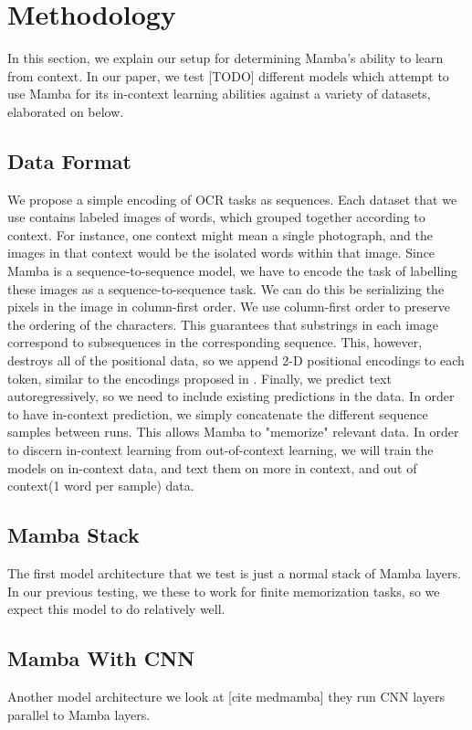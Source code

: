 \section{Methodology}
In this section, we explain our setup for determining Mamba's ability to learn
from context.
In our paper, we test [TODO] different models which attempt to use Mamba for its
in-context learning abilities against a variety of datasets, elaborated on
below.
\subsection{Data Format}
We propose a simple encoding of OCR tasks as sequences.
Each dataset that we use contains labeled images of words, which grouped
together according to context. For instance, one context might mean a single
photograph, and the images in that context would be the isolated words within
that image.
Since Mamba is a sequence-to-sequence model, we have to encode the task of
labelling these images as a sequence-to-sequence task.
We can do this be serializing the pixels in the image in column-first order. We
use column-first order to preserve the ordering of the characters. This
guarantees that substrings in each image correspond to subsequences in the
corresponding sequence.
This, however, destroys all of the positional data, so we append 2-D positional
encodings to each token, similar to the encodings proposed in \cite{attention}.
Finally, we predict text autoregressively, so we need to include existing
predictions in the data.
In order to have in-context prediction, we simply concatenate the different
sequence samples between runs. This allows Mamba to "memorize" relevant data.
In order to discern in-context learning from out-of-context learning, we will
train the models on in-context data, and text them on more in context, and out
of context(1 word per sample) data.
\subsection{Mamba Stack}
The first model architecture that we test is just a normal stack of Mamba
layers. In our previous testing, we these to work for finite memorization tasks,
so we expect this model to do relatively well.
\subsection{Mamba With CNN}
Another model architecture we look at [cite medmamba] they run CNN layers
parallel to Mamba layers.
\subsection{}
